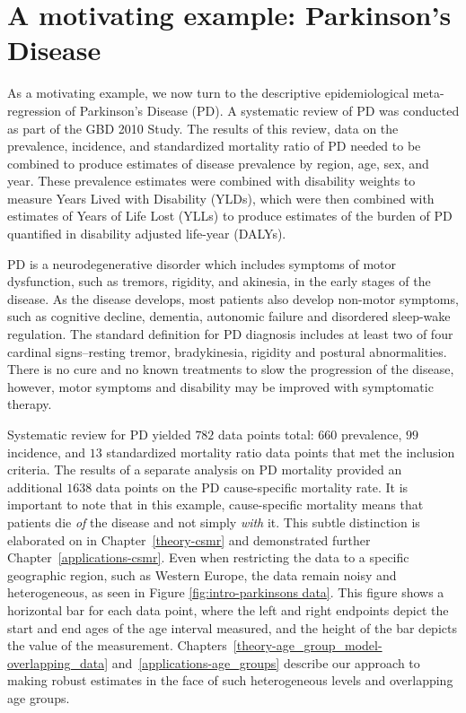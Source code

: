 \section{A motivating example: Parkinson's Disease}
\label{intro-complete_ex}

As a motivating example, we now turn to the descriptive
epidemiological meta-regression of Parkinson's Disease (PD). A
systematic review of PD was conducted as part of the GBD 2010
Study.\cite{GBD_2010_or_parkinsons_paper} The results of this review,
data on the prevalence, incidence, and standardized mortality ratio of PD
needed to be combined to produce estimates of disease prevalence by
region, age, sex, and year.  These prevalence estimates were combined
with disability weights to measure Years Lived with Disability (YLDs),
which were then combined with estimates of Years of Life Lost (YLLs)
to produce estimates of the burden of PD quantified in disability
adjusted life-year (DALYs).

PD is a neurodegenerative disorder which includes symptoms of motor
dysfunction, such as tremors, rigidity, and akinesia, in the early
stages of the disease.  As the disease develops, most patients also
develop non-motor symptoms, such as cognitive decline, dementia,
autonomic failure and disordered sleep-wake regulation.  The standard
definition for PD diagnosis includes at least two of four cardinal
signs--resting tremor, bradykinesia, rigidity and postural abnormalities.
There is no cure and no known treatments to slow the progression of the disease,
however, motor symptoms and disability may be improved with
symptomatic therapy.\cite{poewe_natural_2006, pollock_prevalence_1966, larsen_clinical_1994}

Systematic review for PD yielded $782$ data points total: $660$
prevalence, $99$ incidence, and $13$ standardized mortality ratio data
points that met the inclusion criteria.  The results of a separate
analysis on PD mortality provided an additional $1638$ data points on
the PD cause-specific mortality rate. It is important to note that in
this example, cause-specific mortality means that patients die
\emph{of} the disease and not simply \emph{with} it.  This subtle
distinction is elaborated on in Chapter~\ref{theory-csmr} and
demonstrated further Chapter~\ref{applications-csmr}.  Even when
restricting the data to a specific geographic region, such as Western
Europe, the data remain noisy and heterogeneous, as seen in Figure
\ref{fig:intro-parkinsons data}. This figure shows a horizontal bar
for each data point, where the left and right endpoints depict the
start and end ages of the age interval measured, and the height of the
bar depicts the value of the measurement. Chapters~\ref{theory-age_group_model-overlapping_data}
and~\ref{applications-age_groups} describe our approach to making
robust estimates in the face of such heterogeneous levels and
overlapping age groups.

